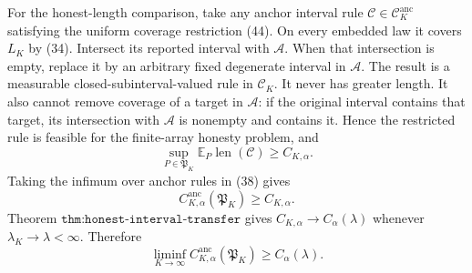 For the honest-length comparison, take any anchor interval rule
\(\mathcal C\in\mathscr C_K^{\mathrm{anc}}\) satisfying the uniform
coverage restriction (44).  On every embedded law it covers \(L_K\) by
(34).  Intersect its reported interval with \(\mathcal A\).  When that
intersection is empty, replace it by an arbitrary fixed degenerate interval
in \(\mathcal A\).  The result is a measurable closed-subinterval-valued
rule in \(\mathscr C_K\).  It never has greater length.  It also cannot
remove coverage of a target in \(\mathcal A\): if the original interval
contains that target, its intersection with \(\mathcal A\) is nonempty and
contains it.  Hence the restricted rule is feasible for the finite-array
honesty problem, and
\[
 \sup_{P\in\mathfrak P_K}
 \mathbb E_P\operatorname{len}(\mathcal C)
 \geq C_{K,\alpha}.
 \tag{38}
\]
Taking the infimum over anchor rules in (38) gives
\[
 C_{K,\alpha}^{\mathrm{anc}}(\mathfrak P_K)
 \geq C_{K,\alpha}.
 \tag{39}
\]
Theorem \(\texttt{thm:honest-interval-transfer}\) gives
\(C_{K,\alpha}\to C_\alpha(\lambda)\) whenever
\(\lambda_K\to\lambda<\infty\).  Therefore
\[
 \liminf_{K\to\infty}
 C_{K,\alpha}^{\mathrm{anc}}(\mathfrak P_K)
 \geq C_\alpha(\lambda).
 \tag{40}
\]

